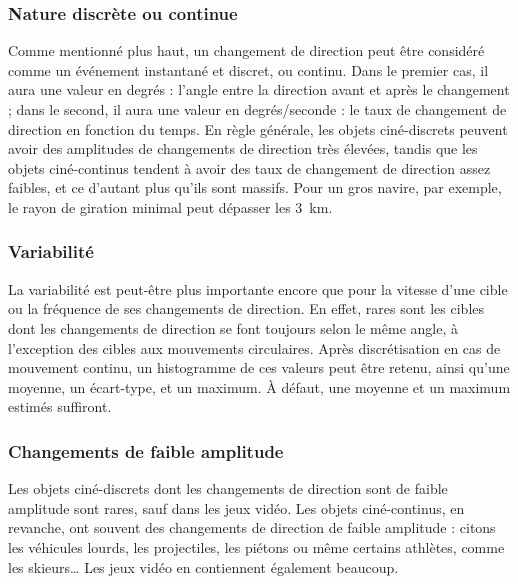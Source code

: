 	\subsubsection{Nature discrète ou continue}
	Comme mentionné plus haut, un changement de direction peut être considéré comme un événement instantané et discret, ou continu. Dans le premier cas, il aura une valeur en degrés : l'angle entre la direction avant et après le changement ; dans le second, il aura une valeur en degrés/seconde : le taux de changement de direction en fonction du temps. En règle générale, les objets ciné-discrets peuvent avoir des amplitudes de changements de direction très élevées, tandis que les objets ciné-continus tendent à avoir des taux de changement de direction assez faibles, et ce d'autant plus qu'ils sont massifs. Pour un gros navire, par exemple, le rayon de giration minimal peut dépasser les 3~km.\footnotemark{}
	
	
	\subsubsection{Variabilité}
	La variabilité est peut-être plus importante encore que pour la vitesse d'une cible ou la fréquence de ses changements de direction. En effet, rares sont les cibles dont les changements de direction se font toujours selon le même angle, à l'exception des cibles aux mouvements circulaires. Après discrétisation en cas de mouvement continu, un histogramme de ces valeurs peut être retenu, ainsi qu'une moyenne, un écart-type, et un maximum. À défaut, une moyenne et un maximum estimés suffiront.
	
	\subsubsection{Changements de faible amplitude}
	Les objets ciné-discrets dont les changements de direction sont de faible amplitude sont rares, sauf dans les jeux vidéo. Les objets ciné-continus, en revanche, ont souvent des changements de direction de faible amplitude : citons les véhicules lourds, les projectiles, les piétons ou même certains athlètes, comme les skieurs\ldots{} Les jeux vidéo en contiennent également beaucoup.
		
